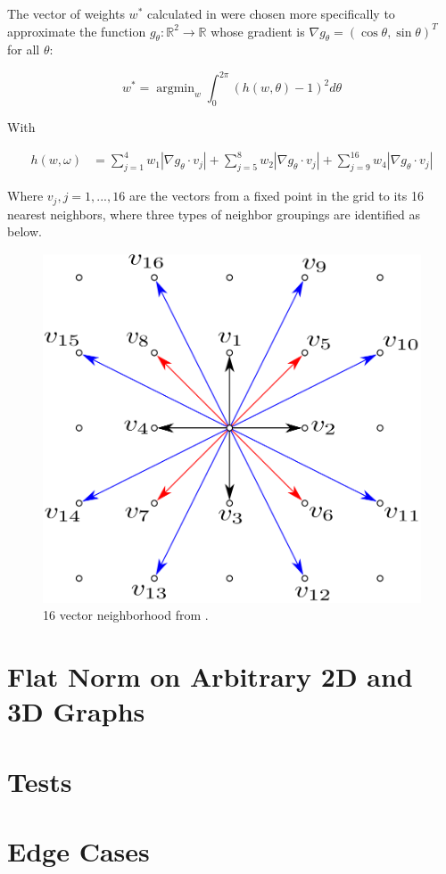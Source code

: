 \documentclass[12pt]{article}
\DeclareMathOperator*{\argmin}{argmin}
\begin{document}
The vector of weights $w^*$ calculated in \cite{shapes} were chosen more specifically to approximate the function $g_\theta:\mathbb{R}^2 \to \mathbb{R}$ whose gradient is $\nabla g_\theta = (\cos \theta, \sin \theta)^T$ for all $\theta$:

\begin{equation}
w^* = \argmin_w \int_0^{2\pi} (h(w,\theta)-1)^2 d\theta
\end{equation}

With

\begin{align*}
h(w,\omega) &= \sum_{j=1}^4 w_1 |\nabla g_\theta \cdot v_j| + \sum_{j=5}^8 w_2 |\nabla g_\theta \cdot v_j| +  \sum_{j=9}^{16} w_4 |\nabla g_\theta \cdot v_j|
\end{align*}

Where $v_j, j= 1,...,16$ are the vectors from a fixed point in the grid to its 16 nearest neighbors, where three types of neighbor groupings are identified as below.

\begin{figure}
\centering
\includegraphics[scale=0.25]{Figure_2_Vixie_Paper.png}
\caption{16 vector neighborhood from \cite{shapes}.}
\end{figure}


\section{Flat Norm on Arbitrary 2D and 3D Graphs}

\section{Tests}

\section{Edge Cases}

\end{document}
